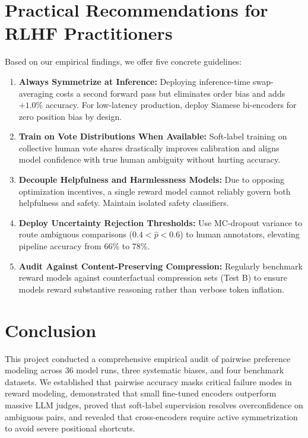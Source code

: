 \documentclass[12pt,a4paper]{article}
\begin{document}
\section{Practical Recommendations for RLHF Practitioners}

Based on our empirical findings, we offer five concrete guidelines:
\begin{enumerate}
    \item \textbf{Always Symmetrize at Inference:} Deploying inference-time swap-averaging costs a second forward pass but eliminates order bias and adds $+1.0\%$ accuracy. For low-latency production, deploy Siamese bi-encoders for zero position bias by design.
    \item \textbf{Train on Vote Distributions When Available:} Soft-label training on collective human vote shares drastically improves calibration and aligns model confidence with true human ambiguity without hurting accuracy.
    \item \textbf{Decouple Helpfulness and Harmlessness Models:} Due to opposing optimization incentives, a single reward model cannot reliably govern both helpfulness and safety. Maintain isolated safety classifiers.
    \item \textbf{Deploy Uncertainty Rejection Thresholds:} Use MC-dropout variance to route ambiguous comparisons ($0.4 < \hat{p} < 0.6$) to human annotators, elevating pipeline accuracy from 66\% to 78\%.
    \item \textbf{Audit Against Content-Preserving Compression:} Regularly benchmark reward models against counterfactual compression sets (Test B) to ensure models reward substantive reasoning rather than verbose token inflation.
\end{enumerate}

\section{Conclusion}

This project conducted a comprehensive empirical audit of pairwise preference modeling across 36 model runs, three systematic biases, and four benchmark datasets. We established that pairwise accuracy masks critical failure modes in reward modeling, demonstrated that small fine-tuned encoders outperform massive LLM judges, proved that soft-label supervision resolves overconfidence on ambiguous pairs, and revealed that cross-encoders require active symmetrization to avoid severe positional shortcuts.

\newpage


\end{document}

